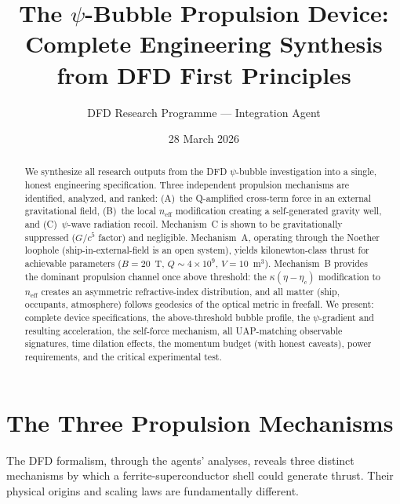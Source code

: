 \documentclass[12pt,aps,prd,superscriptaddress,nofootinbib,longbibliography]{revtex4-2}
\begin{document}
\title{The $\psi$-Bubble Propulsion Device:\\
Complete Engineering Synthesis from DFD First Principles}

\author{DFD Research Programme --- Integration Agent}
\date{28 March 2026}

\begin{abstract}
We synthesize all research outputs from the DFD $\psi$-bubble
investigation into a single, honest engineering specification.  Three
independent propulsion mechanisms are identified, analyzed, and ranked:
(A)~the Q-amplified cross-term force in an external gravitational field,
(B)~the local $n_{\mathrm{eff}}$ modification creating a self-generated
gravity well, and (C)~$\psi$-wave radiation recoil.  Mechanism~C is
shown to be gravitationally suppressed ($G/c^5$ factor) and negligible.
Mechanism~A, operating through the Noether loophole (ship-in-external-field
is an open system), yields kilonewton-class thrust for achievable
parameters ($B = 20$~T, $Q \sim 4 \times 10^9$, $V = 10$~m$^3$).
Mechanism~B provides the dominant propulsion channel once above
threshold: the $\kappa(\eta - \eta_c)$ modification to $n_{\mathrm{eff}}$
creates an asymmetric refractive-index distribution, and all matter
(ship, occupants, atmosphere) follows geodesics of the optical metric in
freefall.  We present: complete device specifications, the above-threshold
bubble profile, the $\psi$-gradient and resulting acceleration, the
self-force mechanism, all UAP-matching observable signatures, time dilation
effects, the momentum budget (with honest caveats), power requirements,
and the critical experimental test.
\end{abstract}

\maketitle
\tableofcontents

\section{The Three Propulsion Mechanisms}\label{sec:three-mechanisms}

The DFD formalism, through the agents' analyses, reveals three distinct
mechanisms by which a ferrite-superconductor shell could generate thrust.
Their physical origins and scaling laws are fundamentally different.
\end{document}
